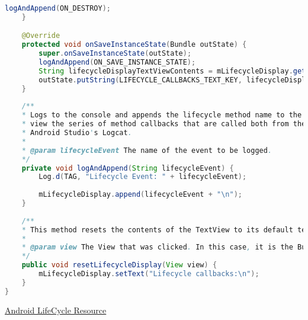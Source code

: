 \documentclass[12pt]{article} %
\begin{document}
\begin{lstlisting}[language=Java]
		logAndAppend(ON_DESTROY);
	}

	@Override
	protected void onSaveInstanceState(Bundle outState) {
		super.onSaveInstanceState(outState);
		logAndAppend(ON_SAVE_INSTANCE_STATE);
		String lifecycleDisplayTextViewContents = mLifecycleDisplay.getText().toString();
		outState.putString(LIFECYCLE_CALLBACKS_TEXT_KEY, lifecycleDisplayTextViewContents);
	}
	
	/**
	* Logs to the console and appends the lifecycle method name to the TextView so that you can
	* view the series of method callbacks that are called both from the app and from within
	* Android Studio's Logcat.
	*
	* @param lifecycleEvent The name of the event to be logged.
	*/
	private void logAndAppend(String lifecycleEvent) {
		Log.d(TAG, "Lifecycle Event: " + lifecycleEvent);
		
		mLifecycleDisplay.append(lifecycleEvent + "\n");
	}
	
	/**
	* This method resets the contents of the TextView to its default text of "Lifecycle callbacks"
	*
	* @param view The View that was clicked. In this case, it is the Button from our layout.
	*/
	public void resetLifecycleDisplay(View view) {
		mLifecycleDisplay.setText("Lifecycle callbacks:\n");
	}
}
\end{lstlisting}

\href{https://developer.android.com/guide/components/activities/activity-lifecycle.html}{Android LifeCycle Resource}
\end{document}
